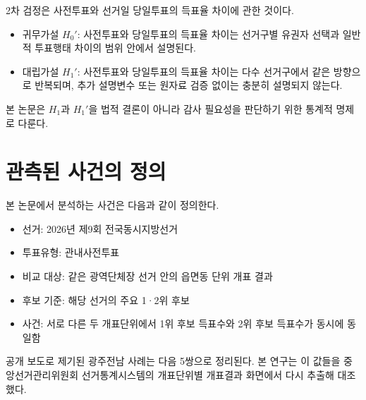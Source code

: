 \documentclass[preprint]{IEIE}
\begin{document}
2차 검정은 사전투표와 선거일 당일투표의 득표율 차이에 관한 것이다.

\begin{itemize}
\item 귀무가설 \(H_0'\): 사전투표와 당일투표의 득표율 차이는 선거구별 유권자 선택과 일반적 투표행태 차이의 범위 안에서 설명된다.
\item 대립가설 \(H_1'\): 사전투표와 당일투표의 득표율 차이는 다수 선거구에서 같은 방향으로 반복되며, 추가 설명변수 또는 원자료 검증 없이는 충분히 설명되지 않는다.
\end{itemize}

본 논문은 \(H_1\)과 \(H_1'\)을 법적 결론이 아니라 감사 필요성을 판단하기 위한 통계적 명제로 다룬다.

\section{관측된 사건의 정의}

본 논문에서 분석하는 사건은 다음과 같이 정의한다.

\begin{itemize}
\item 선거: 2026년 제9회 전국동시지방선거
\item 투표유형: 관내사전투표
\item 비교 대상: 같은 광역단체장 선거 안의 읍면동 단위 개표 결과
\item 후보 기준: 해당 선거의 주요 1·2위 후보
\item 사건: 서로 다른 두 개표단위에서 1위 후보 득표수와 2위 후보 득표수가 동시에 동일함
\end{itemize}

공개 보도로 제기된 광주전남 사례는 다음 5쌍으로 정리된다. 본 연구는 이 값들을 중앙선거관리위원회 선거통계시스템의 개표단위별 개표결과 화면에서 다시 추출해 대조했다.

\begin{table}[t]
\centering
\scriptsize
{}
\end{table}
\end{document}

